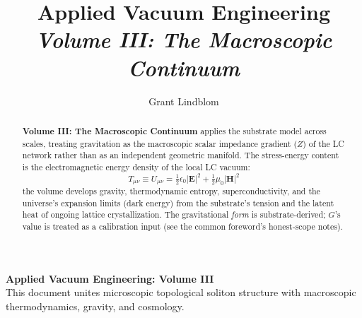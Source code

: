 \title{\textbf{Applied Vacuum Engineering} \\ \large \textit{Volume III: The Macroscopic Continuum}}
\author{Grant Lindblom}
\date{}

\maketitle

\vfill
\noindent\textbf{Applied Vacuum Engineering: Volume III} \\
This document unites microscopic topological soliton structure with macroscopic thermodynamics, gravity, and cosmology.

\begin{abstract}
    \textbf{Volume III: The Macroscopic Continuum} applies the substrate model across scales, treating gravitation as the macroscopic scalar impedance gradient ($Z$) of the LC network rather than as an independent geometric manifold. The stress-energy content is the electromagnetic energy density of the local LC vacuum:
    \begin{equation}
        T_{\mu\nu} \equiv U_{\mu\nu} = \tfrac{1}{2}\epsilon_0 |\mathbf{E}|^2 + \tfrac{1}{2}\mu_0 |\mathbf{H}|^2
    \end{equation}
    the volume develops gravity, thermodynamic entropy, superconductivity, and the universe's expansion limits (dark energy) from the substrate's tension and the latent heat of ongoing lattice crystallization. The gravitational \emph{form} is substrate-derived; $G$'s value is treated as a calibration input (see the common foreword's honest-scope notes).
\end{abstract}
